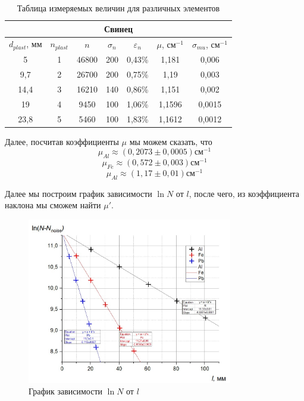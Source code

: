 \documentclass[a4paper, 12pt]{article}%
\begin{document}
\newpage
\begin{table}[h]
\begin{center}
\begin{tabular}{|c|c|c|c|c|c|c|}
\hline
\multicolumn{7}{|c|}{Свинец}                                                                                       \\ \hline
$d_{plast}$, мм & $n_{plast}$ & $n$   & $\sigma_n$ & $\varepsilon_n$ & $\mu$, см$^{-1}$ & $\sigma_{mu}$, см$^{-1}$ \\ \hline
5               & 1           & 46800 & 200        & 0,43\%          & 1,181            & 0,006                    \\ \hline
9,7             & 2           & 26700 & 200        & 0,75\%          & 1,19             & 0,003                    \\ \hline
14,4            & 3           & 16210 & 140        & 0,86\%          & 1,151            & 0,002                    \\ \hline
19              & 4           & 9450  & 100        & 1,06\%          & 1,1596           & 0,0015                   \\ \hline
23,8            & 5           & 5460  & 100        & 1,83\%          & 1,1612           & 0,0012                   \\ \hline
\end{tabular}
\caption{Таблица измеряемых величин для различных элементов}
\end{center}
\end{table}
Далее, посчитав коэффициенты $\mu$ мы можем сказать, что 
\[\mu_{Al} \approx (0,2073 \pm 0,0005) \text{см}^{-1}\]
\[\mu_{Fe} \approx (0,572 \pm 0,003) \text{см}^{-1}\]
\[\mu_{Al} \approx (1,17 \pm 0,01) \text{см}^{-1}\]

Далее мы построим график зависимости $\ln N$ от $l$, после чего, из коэффициента наклона мы сможем найти $\mu'$.
\begin{figure}[h]
\begin{center}
\includegraphics[width = 0.8\textwidth]{1.jpg}
\caption{График зависимости $\ln N$ от $l$}
\end{center}
\end{figure}
\end{document}
